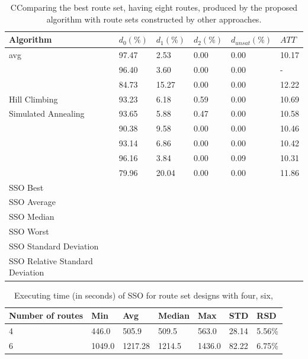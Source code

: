     \begin{table}[H]
    \centering
    \hspace*{-1.0cm}
    \begin{tabular}{|l||l|l|l|l|l|}
    \hline
    Algorithm & $d_0(\%)$ & $d_1(\%)$ & $d_2(\%)$ & $d_{unsat}(\%)$ & $ATT$ \\
    \hline
    \citet{kechagiopoulos14} avg & 97.47 & 2.53 & 0.00 & 0.00 & 10.17 \\
    \citet{nikolic14} & 96.40 & 3.60 & 0.00 & 0.00 & - \\
    \citet{kidwai98} & 84.73 & 15.27 & 0.00 & 0.00 & 12.22 \\
    \citet{fan09} Hill Climbing & 93.23 & 6.18 & 0.59 & 0.00 & 10.69 \\
    \citet{fan09} Simulated Annealing & 93.65 & 5.88 & 0.47 & 0.00 & 10.58 \\
    \citet{chakroborty02} & 90.38 & 9.58 & 0.00 & 0.00 & 10.46 \\
    \citet{zhang10} & 93.14 & 6.86 & 0.00 & 0.00 & 10.42 \\
    \citet{chew12} & 96.16 & 3.84 & 0.00 & 0.09 & 10.31 \\
    \citet{baaj91} & 79.96 & 20.04 & 0.00 & 0.00 & 11.86 \\
    \hline
    \hline
    SSO Best & ~ & ~ & ~ & ~ & ~ \\
    SSO Average & ~ & ~ & ~ & ~ & ~ \\
    SSO Median & ~ & ~ & ~ & ~ & ~ \\
    SSO Worst & ~ & ~ & ~ & ~ & ~ \\
    SSO Standard Deviation & ~ & ~ & ~ & ~ & ~ \\
    SSO Relative Standard Deviation & ~ & ~ & ~ & ~ & ~ \\
    \hline
    \end{tabular}
    \caption {CComparing the best route set, having eight routes, produced by the proposed algorithm with route sets constructed by other approaches.}
    \label{table:performanceComparison_8}
    \end{table}


\begin{table}[H]
    \centering
    \begin{tabular}{|l||l|l|l|l|l|l|}
    \hline
    Number of routes & Min & Avg & Median & Max & STD & RSD \\
    \hline
    4 & 446.0 & 505.9 & 509.5 & 563.0 & 28.14 & 5.56\%\\
    6 & 1049.0 & 1217.28 & 1214.5 & 1436.0 & 82.22 & 6.75\%\\
    \hline
    \end{tabular}
    \caption {Executing time (in seconds) of SSO for route set designs with four, six, }
    \label{table:performanceComparison_runtime}
    \end{table}